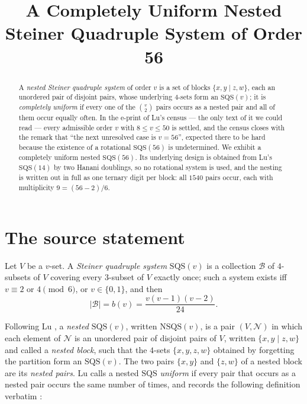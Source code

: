 \documentclass[11pt]{amsart}
\title[A completely uniform nested $\SQS(56)$]
{A Completely Uniform Nested Steiner Quadruple System of Order 56}
\date{}
\newcommand{\SQS}{\mathrm{SQS}}
\newcommand{\NSQS}{\mathrm{NSQS}}
\begin{document}
\begin{abstract}
A \emph{nested Steiner quadruple system} of order $v$ is a set of blocks
$\{x,y\mid z,w\}$, each an unordered pair of disjoint pairs, whose underlying
$4$-sets form an $\SQS(v)$; it is \emph{completely uniform} if every one of the
$\binom{v}{2}$ pairs occurs as a nested pair and all of them occur equally
often. In the e-print of Lu's census --- the only text of it we could read ---
every admissible order $v$ with $8\le v\le 50$ is settled, and the census closes
with the remark that ``the next unresolved case is $v=56$'', expected there to be
hard because the existence of a rotational $\SQS(56)$ is undetermined. We
exhibit a completely uniform nested $\SQS(56)$. Its underlying design is
obtained from Lu's $\SQS(14)$ by two Hanani doublings, so no rotational
system is used, and the nesting is written out in full as one ternary digit per
block: all $1540$ pairs occur, each with multiplicity $9=(56-2)/6$.
\end{abstract}

\maketitle

\section{The source statement}

Let $V$ be a $v$-set. A \emph{Steiner quadruple system} $\SQS(v)$ is a
collection $\mathcal B$ of $4$-subsets of $V$ covering every $3$-subset of $V$
exactly once; such a system exists iff $v\equiv2$ or $4\pmod 6$, or
$v\in\{0,1\}$, and then
\begin{equation}\label{eq:b}
 |\mathcal B|=b(v)=\frac{v(v-1)(v-2)}{24}.
\end{equation}

Following Lu \cite[\S1]{Lu}, a \emph{nested $\SQS(v)$}, written $\NSQS(v)$, is a
pair $(V,\mathcal N)$ in which each element of $\mathcal N$ is an unordered pair
of disjoint pairs of $V$, written $\{x,y\mid z,w\}$ and called a \emph{nested
block}, such that the $4$-sets $\{x,y,z,w\}$ obtained by forgetting the
partition form an $\SQS(v)$. The two pairs $\{x,y\}$ and $\{z,w\}$ of a nested
block are its \emph{nested pairs}. Lu calls a nested $\SQS$ \emph{uniform} if
every pair that occurs as a nested pair occurs the same number of times, and
records the following definition verbatim \cite[\S1]{Lu}:
\end{document}
